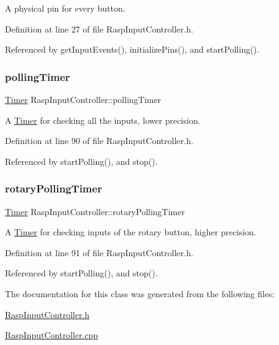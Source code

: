A physical pin for every button. 



Definition at line 27 of file Rasp\+Input\+Controller.\+h.



Referenced by get\+Input\+Events(), initialize\+Pins(), and start\+Polling().

\mbox{\label{class_rasp_input_controller_a388779c1ddf9f5910a92cd350cc59e5c}} 
\subsubsection{\texorpdfstring{polling\+Timer}{pollingTimer}}
{\footnotesize\ttfamily \hyperlink{class_timer}{Timer} Rasp\+Input\+Controller\+::polling\+Timer\hspace{0.3cm}{\ttfamily [private]}}



A \hyperlink{class_timer}{Timer} for checking all the inputs, lower precision. 



Definition at line 90 of file Rasp\+Input\+Controller.\+h.



Referenced by start\+Polling(), and stop().

\mbox{\label{class_rasp_input_controller_a55b065ae154806341fd900a8b61110a5}} 
\subsubsection{\texorpdfstring{rotary\+Polling\+Timer}{rotaryPollingTimer}}
{\footnotesize\ttfamily \hyperlink{class_timer}{Timer} Rasp\+Input\+Controller\+::rotary\+Polling\+Timer\hspace{0.3cm}{\ttfamily [private]}}



A \hyperlink{class_timer}{Timer} for checking inputs of the rotary button, higher precision. 



Definition at line 91 of file Rasp\+Input\+Controller.\+h.



Referenced by start\+Polling(), and stop().



The documentation for this class was generated from the following files\+:\begin{DoxyCompactItemize}
\item 
\hyperlink{_rasp_input_controller_8h}{Rasp\+Input\+Controller.\+h}\item 
\hyperlink{_rasp_input_controller_8cpp}{Rasp\+Input\+Controller.\+cpp}\end{DoxyCompactItemize}
